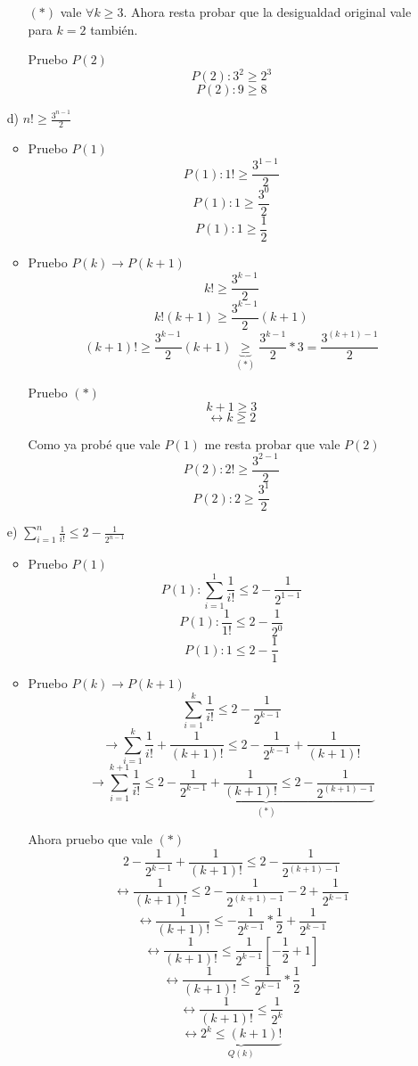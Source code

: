\documentclass[10pt,a4paper]{article}
\begin{document}
\begin{enumerate}
\begin{itemize}
	$(*)$ vale $\forall k \geq 3$. Ahora resta probar que la desigualdad original vale para $k=2$ también.
	
	Pruebo $P(2)$
	$$P(2):3^{2}\geq 2^{3}$$
	$$P(2):9\geq 8$$
	\end{itemize}

\item[d)]$n!\geq \frac{3^{n-1}}{2}$
	\begin{itemize}
	\item Pruebo $P(1)$
	$$P(1):1!\geq \frac{3^{1-1}}{2}$$
	$$P(1):1 \geq \frac{3^{0}}{2}$$
	$$P(1):1 \geq \frac{1}{2}$$
	
	\item Pruebo $P(k)\rightarrow P(k+1)$
	$$k!\geq \frac{3^{k-1}}{2}$$
	$$k! (k+1)\geq \frac{3^{k-1}}{2} (k+1)$$
	$$(k+1)!\geq \frac{3^{k-1}}{2} (k+1)\underbrace{ \geq}_{(*)}  \frac{3^{k-1}}{2} * 3 = \frac{3^{(k+1)-1}}{2} $$
	
	Pruebo $(*)$
	$$k+1 \geq 3$$
	$$\leftrightarrow k \geq 2$$
	
Como ya probé que vale $P(1)$ me resta probar que vale $P(2)$
$$P(2):2!\geq \frac{3^{2-1}}{2}$$
$$P(2):2 \geq \frac{3^{1}}{2}$$
	
	\end{itemize}
	
\item[e)]$\sum^{n}_{i=1}\frac{1}{i!} \leq 2-\frac{1}{2^{n-1}}$
	\begin{itemize}
	\item Pruebo $P(1)$
	$$P(1):\sum^{1}_{i=1}\frac{1}{i!} \leq 2-\frac{1}{2^{1-1}}$$
	$$P(1):\frac{1}{1!} \leq 2-\frac{1}{2^{0}}$$
	$$P(1):1 \leq 2-\frac{1}{1}$$
	
	\item Pruebo $P(k)\rightarrow P(k+1)$
	$$\sum^{k}_{i=1}\frac{1}{i!} \leq 2-\frac{1}{2^{k-1}}$$	
	$$\rightarrow \sum^{k}_{i=1}\frac{1}{i!} + \frac{1}{(k+1)!} \leq 2-\frac{1}{2^{k-1}} + \frac{1}{(k+1)!}$$	
	$$\rightarrow \sum^{k+1}_{i=1}\frac{1}{i!} \leq \underbrace{2-\frac{1}{2^{k-1}} + \frac{1}{(k+1)!} \leq 2-\frac{1}{2^{(k+1)-1}}}_{(*)}$$
	
	Ahora pruebo que vale $(*)$
	$$2-\frac{1}{2^{k-1}} + \frac{1}{(k+1)!} \leq 2-\frac{1}{2^{(k+1)-1}}$$
	$$\leftrightarrow \frac{1}{(k+1)!} \leq 2-\frac{1}{2^{(k+1)-1}}-2+\frac{1}{2^{k-1}}$$
	$$\leftrightarrow \frac{1}{(k+1)!} \leq -\frac{1}{2^{k-1}}*\frac{1}{2}+  \frac{1}{2^{k-1}}$$
	$$\leftrightarrow \frac{1}{(k+1)!} \leq  \frac{1}{2^{k-1}} \left[  -\frac{1}{2}+1 \right] $$
	$$\leftrightarrow \frac{1}{(k+1)!} \leq  \frac{1}{2^{k-1}}*\frac{1}{2} $$
	$$\leftrightarrow \frac{1}{(k+1)!} \leq  \frac{1}{2^{k}} $$
	$$\leftrightarrow \underbrace{2^{k}\leq  (k+1)!}_{Q(k)} $$
	

\end{itemize}
\end{enumerate}
\end{document}
